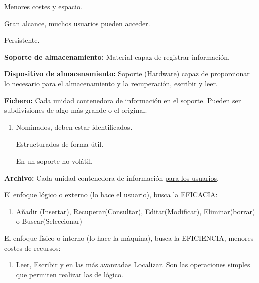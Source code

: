 \documentclass[12pt, twoside, openright]{report} %
\begin{document}
\begin{enumerate}
\begin{enumerate}
      
      Menores costes y espacio.
      

      
      Gran alcance, muchos usuarios pueden acceder.
      

      
      Persistente.
      
    \end{enumerate}

    
    \textbf{Soporte de almacenamiento:} Material capaz de registrar
    información.
    

    
    \textbf{Dispositivo de almacenamiento:} Soporte (Hardware) capaz de
    proporcionar lo necesario para el almacenamiento y la recuperación,
    escribir y leer.
    

    
    \textbf{Fichero:} Cada unidad contenedora de información
    \underline{en el soporte}. Pueden ser subdivisiones de algo más
    grande o el original.
    

    \begin{enumerate}
    \item Nominados, deben estar identificados.
      

      
      Estructurados de forma útil.
      

      
      En un soporte no volátil.
      
    \end{enumerate}

    
    \textbf{Archivo:} Cada unidad contenedora de información
    \underline{para los usuarios}.
    

    
    El enfoque lógico o externo (lo hace el usuario), busca la EFICACIA:
    

    \begin{enumerate}
    \item Añadir (Insertar), Recuperar(Consultar), Editar(Modificar),
      Eliminar(borrar) o Buscar(Seleccionar)
      
    \end{enumerate}

    
    El enfoque físico o interno (lo hace la máquina), busca la
    EFICIENCIA, menores costes de recursos:
    

    \begin{enumerate}
    \item Leer, Escribir y en las más avanzadas Localizar. Son las
      operaciones simples que permiten realizar las de lógico.
      
    \end{enumerate}
  \end{enumerate}
\end{document}
